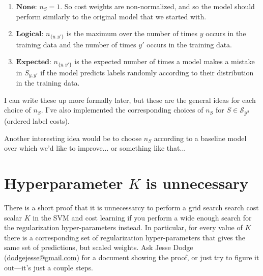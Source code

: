 \documentclass[11pt,letterpaper]{article}
\begin{document}
\begin{enumerate}

\item $\mathbf{None}$: $n_S=1$.  So cost weights are non-normalized, and so the
model should perform similarly to the original model that we started with.

\item $\mathbf{Logical}$: $n_{\{y,y'\}}$ is the maximum over the number of times
$y$ occurs in the training data and the number of times $y'$ occurs in the training
data.

\item $\mathbf{Expected}$: $n_{\{y,y'\}}$ is the expected number of times a model makes a mistake in $S_{y,y'}$ if the model predicts labels randomly according
to their distribution in the training data.

\end{enumerate}

I can write these up more formally later, but these are the general ideas for each 
choice of $n_S$.  I've also implemented the corresponding choices of $n_S$ for
$S\in\mathcal{S}_{\mathcal{Y}^2}$ (ordered label costs).

Another interesting idea would be to choose $n_S$ according to a baseline model over which we'd like to improve... or something like that... 

\section{Hyperparameter $K$ is unnecessary}

There is a short proof that it is unnecessarcy to perform a grid search
search cost scalar $K$ in the SVM and cost learning if you perform a wide
enough search for the regularization hyper-parameters instead.  In particular,
for every value of $K$ there is a corresponding set of regularization 
hyper-parameters that gives the same set of predictions, but scaled weights.
 Ask Jesse Dodge (\url{dodgejesse@gmail.com}) for a document showing the proof,
 or just try to figure it out---it's just a couple steps.
 
\end{document}
